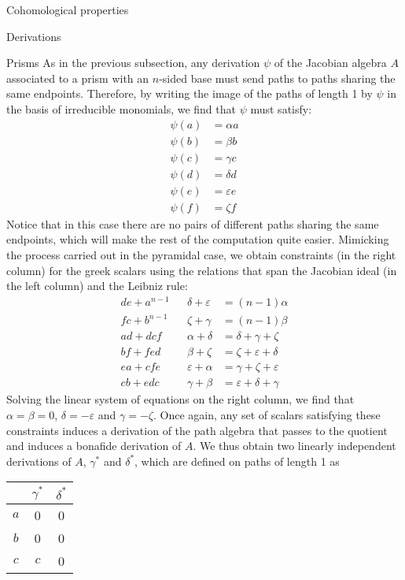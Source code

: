 \begin{chapter}{Cohomological properties}
\begin{section}{Derivations}
\begin{subsection}{Prisms}
As in the previous subsection, any derivation $\psi$ of the Jacobian algebra $A$ associated to a prism with an $n$-sided base must send paths to paths sharing the same endpoints. Therefore, by writing the image of the paths of length 1 by $\psi$ in the basis of irreducible monomials, we find that $\psi$ must satisfy:
\begin{align*}
\psi(a) &= \alpha a\\
\psi(b) &= \beta b\\
\psi(c) &= \gamma c \\
\psi(d) &= \delta d \\
\psi(e) &= \varepsilon e \\
\psi(f) &= \zeta f
\end{align*}
Notice that in this case there are no pairs of different paths sharing the same endpoints, which will make the rest of the computation quite easier. Mimicking the process carried out in the pyramidal case, we obtain constraints (in the right column) for the greek scalars using the relations that span the Jacobian ideal (in the left column) and the Leibniz rule:
\begin{align*}
de+a^{n-1} &  	&\delta+\varepsilon 	&=(n-1)\alpha\\
fc+b^{n-1}  &  	&\zeta+\gamma 		&=(n-1)\beta\\
ad+dcf	&	&\alpha+\delta		&=\delta+\gamma+\zeta\\
bf+fed	&	&\beta+\zeta		&=\zeta+\varepsilon+\delta\\
ea+cfe	&	&\varepsilon+\alpha	&=\gamma+\zeta+\varepsilon\\
cb+edc	&	&\gamma+\beta		&=\varepsilon+\delta+\gamma
\end{align*} 
Solving the linear system of equations on the right column, we find that $\alpha=\beta=0$, $\delta=-\varepsilon$ and $\gamma=-\zeta$. Once again, any set of scalars satisfying these constraints induces a derivation of the path algebra that passes to the quotient and induces a bonafide derivation of $A$. We thus obtain two linearly independent derivations of $A$, $\gamma^*$ and $\delta^*$, which are defined on paths of length 1 as
\begin{center}
\begin{tabular}{ c | c | c }
	& 	$\gamma^*$ 	& $\delta^*$\\
\hline
$a$ & 0 		& 0		\\
$b$ & 	0 		& 0		 \\
$c$ & 	$c$ 		& 0	 \\

\end{tabular}
\end{center}
\end{subsection}
\end{section}
\end{chapter}
